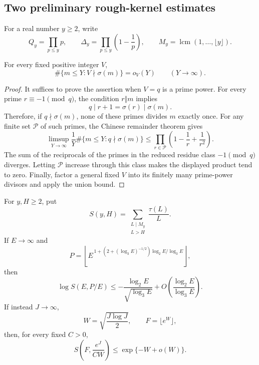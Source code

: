 \subsection{Two preliminary rough-kernel estimates}

For a real number $y\geq2$, write
\[
 Q_y=\prod_{p\leq y}p,
 \qquad
 \Delta_y=\prod_{p\leq y}\left(1-\frac1p\right),
 \qquad
 M_y=\operatorname{lcm}(1,\ldots,\lfloor y\rfloor).
\]

\begin{lemma}
\label{lem:qadd:fixed-modulus-normality}
For every fixed positive integer $V$,
\[
 \#\{m\leq Y:V\nmid\sigma(m)\}=o_V(Y)
 \qquad(Y\to\infty).
\]
\end{lemma}

\begin{proof}
It suffices to prove the assertion when $V=q$ is a prime power.
For every prime $r\equiv-1\pmod q$, the condition $r\Vert m$
implies
\[
 q\mid r+1=\sigma(r)\mid\sigma(m).
\]
Therefore, if $q\nmid\sigma(m)$, none of these primes divides
$m$ exactly once. For any finite set $\mathcal P$ of such primes,
the Chinese remainder theorem gives
\[
 \limsup_{Y\to\infty}\frac1Y
       \#\{m\leq Y:q\nmid\sigma(m)\}
 \leq\prod_{r\in\mathcal P}
            \left(1-\frac1r+\frac1{r^2}\right).
\]
The sum of the reciprocals of the primes in the reduced residue
class $-1\pmod q$ diverges. Letting $\mathcal P$ increase through
this class makes the displayed product tend to zero. Finally,
factor a general fixed $V$ into its finitely many prime-power
divisors and apply the union bound.
\end{proof}

\begin{lemma}
\label{lem:qadd:kernel-tails}
For $y,H\geq2$, put
\[
 S(y,H)=\sum_{\substack{L\mid M_y\\L>H}}
                  \frac{\tau(L)}L.
\]
If $E\to\infty$ and
\[
 P=\left\lfloor
 E^{\,1+(2+(\log_3 E)^{-1/2})\log_2E/\log_3E}
 \right\rfloor,
\]
then
\begin{equation}
\label{eq:qadd:fixed-kernel-tail}
 \log S(E,P/E)
 \leq-\frac{\log_2E}{\sqrt{\log_3E}}
      +O\left(\frac{\log_2E}{\log_3E}\right).
\end{equation}
If instead $J\to\infty$,
\[
 W=\sqrt{\frac{J\log J}{2}},
 \qquad F=\lfloor e^W\rfloor,
\]
then, for every fixed $C>0$,
\begin{equation}
\label{eq:qadd:moving-kernel-tail}
 S\left(F,\frac{e^J}{CW}\right)
 \leq\exp\{-W+o(W)\}.
\end{equation}
\end{lemma}

